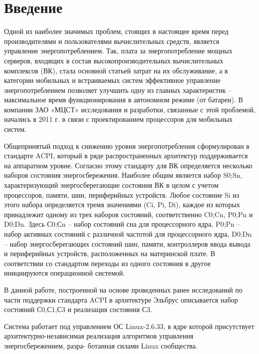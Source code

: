 \documentclass{article}
\begin{document}


\tableofcontents

\newpage

\section{Введение}

Одной из наиболее значимых проблем, стоящих в настоящее время перед производителями и пользователями вычислительных средств, является управление энергопотреблением. Так, плата за энергопотребление мощных серверов, входящих в состав высокопроизводительных вычислительных комплексов (ВК), стала основной статьей затрат на их
обслуживание, а в категории мобильных и встраиваемых систем эффективное управление
энергопотреблением позволяет улучшить одну из главных характеристик – максимальное
время функционирования в автономном режиме (от батареи). В компании ЗАО «МЦСТ»
исследования и разработки, связанные с этой проблемой, начались в 2011 г. в связи с проектированием процессоров для мобильных систем.

Общепринятый подход к снижению уровня энергопотребления сформулирован в
стандарте ACPI, который в ряде распространенных архитектур поддерживается на аппаратном уровне. Согласно этому стандарту для ВК определяется несколько наборов состояния энергосбережения. Наиболее общим является набор {S0;Sn}, характеризующий
энергосберегающие состояния ВК в целом с учетом процессоров, памяти, шин, периферийных устройств. Любое состояние Si из этого набора определяется тремя значениями
(Ci, Pi, Di), каждое из которых принадлежит одному из трех наборов состояний, соответственно {C0;Cn}, {P0;Pn} и {D0;Dn}. Здесь {С0;Сn} – набор состояний сна для процессорного ядра, {P0;Pn} – набор активных состояний с различной частотой для процессорного ядра, {D0;Dn} – набор энергосберегающих состояний шин, памяти, контроллеров
ввода вывода и периферийных устройств, расположенных на материнской плате. В соответствии со стандартом переходы из одного состояния в другое инициируются операционной системой.

В данной работе, построенной на основе проведенных ранее исследований по части
поддержки стандарта ACPI в архитектуре Эльбрус описывается набор состояний С0,С1,С3 и реализация состояния С3.

Система работает под управлением ОС Linux-2.6.33, в ядре которой присутствует
архитектурно-независимая реализация алгоритмов управления энергосбережением, разра-
ботанная силами Linux сообщества. 
\end{document}
